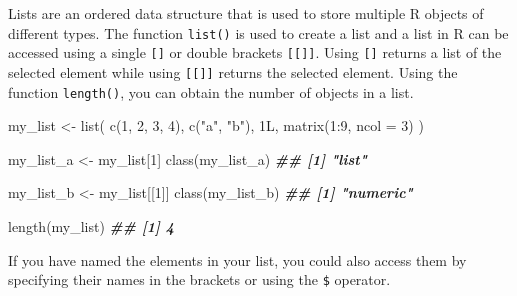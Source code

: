 \documentclass[
]{book}
\newenvironment{Shaded}{\begin{snugshade}}{\end{snugshade}}
\newcommand{\AttributeTok}[1]{\textcolor[rgb]{0.77,0.63,0.00}{#1}}
\newcommand{\DecValTok}[1]{\textcolor[rgb]{0.00,0.00,0.81}{#1}}
\newcommand{\DocumentationTok}[1]{\textcolor[rgb]{0.56,0.35,0.01}{\textbf{\textit{#1}}}}
\newcommand{\FunctionTok}[1]{\textcolor[rgb]{0.00,0.00,0.00}{#1}}
\newcommand{\NormalTok}[1]{#1}
\newcommand{\OtherTok}[1]{\textcolor[rgb]{0.56,0.35,0.01}{#1}}
\newcommand{\SpecialCharTok}[1]{\textcolor[rgb]{0.00,0.00,0.00}{#1}}
\newcommand{\StringTok}[1]{\textcolor[rgb]{0.31,0.60,0.02}{#1}}
\begin{document}
Lists are an ordered data structure that is used to store multiple R objects of different types. The function \texttt{list()} is used to create a list and a list in R can be accessed using a single \texttt{{[}{]}} or double brackets \texttt{{[}{[}{]}{]}}. Using \texttt{{[}{]}} returns a list of the selected element while using \texttt{{[}{[}{]}{]}} returns the selected element. Using the function \texttt{length()}, you can obtain the number of objects in a list.

\begin{Shaded}
\begin{Highlighting}[]
\NormalTok{my\_list }\OtherTok{\textless{}{-}} \FunctionTok{list}\NormalTok{(}
  \FunctionTok{c}\NormalTok{(}\DecValTok{1}\NormalTok{, }\DecValTok{2}\NormalTok{, }\DecValTok{3}\NormalTok{, }\DecValTok{4}\NormalTok{),}
  \FunctionTok{c}\NormalTok{(}\StringTok{"a"}\NormalTok{, }\StringTok{"b"}\NormalTok{),}
\NormalTok{  1L,}
  \FunctionTok{matrix}\NormalTok{(}\DecValTok{1}\SpecialCharTok{:}\DecValTok{9}\NormalTok{, }\AttributeTok{ncol =} \DecValTok{3}\NormalTok{)}
\NormalTok{)}

\NormalTok{my\_list\_a }\OtherTok{\textless{}{-}}\NormalTok{ my\_list[}\DecValTok{1}\NormalTok{]}
\FunctionTok{class}\NormalTok{(my\_list\_a)}
\DocumentationTok{\#\# [1] "list"}

\NormalTok{my\_list\_b }\OtherTok{\textless{}{-}}\NormalTok{ my\_list[[}\DecValTok{1}\NormalTok{]]}
\FunctionTok{class}\NormalTok{(my\_list\_b)}
\DocumentationTok{\#\# [1] "numeric"}

\FunctionTok{length}\NormalTok{(my\_list)}
\DocumentationTok{\#\# [1] 4}
\end{Highlighting}
\end{Shaded}

If you have named the elements in your list, you could also access them by specifying their names in the brackets or using the \texttt{\$} operator.

\begin{Shaded}
\end{Shaded}
\end{document}
